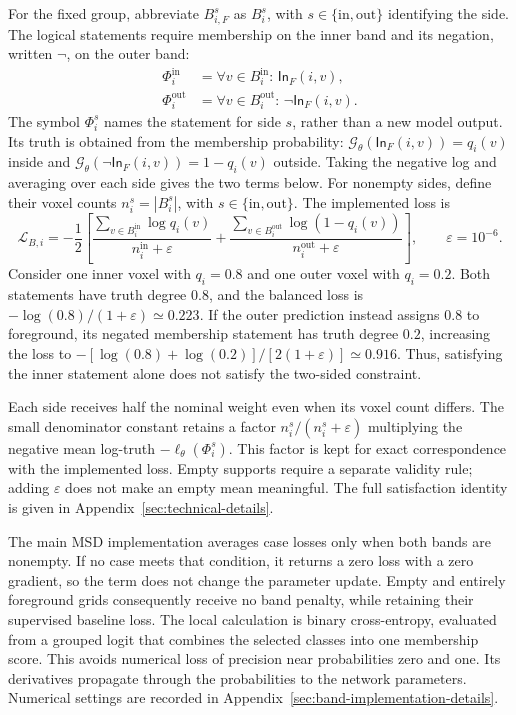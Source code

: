 \documentclass[12pt,a4paper]{article}
\begin{document}
For the fixed group, abbreviate $B_{i,F}^s$ as $B_i^s$, with
$s\in\{\mathrm{in},\mathrm{out}\}$ identifying the side. The logical
statements require membership on the inner band and its negation,
written $\lnot$, on the outer band:
\begin{equation}
\begin{aligned}
\Phi_i^{\mathrm{in}}
 &=\forall v\in B_i^{\mathrm{in}}:\,\mathsf{In}_{F}(i,v),\\
\Phi_i^{\mathrm{out}}
 &=\forall v\in B_i^{\mathrm{out}}:\,\lnot\mathsf{In}_{F}(i,v).
\end{aligned}
\label{eq:band-logical-statements}
\end{equation}
The symbol $\Phi_i^s$ names the statement for side $s$, rather than a
new model output. Its truth is obtained from the membership probability:
$\mathcal G_\theta(\mathsf{In}_F(i,v))=q_i(v)$ inside and
$\mathcal G_\theta(\lnot\mathsf{In}_F(i,v))=1-q_i(v)$ outside.
Taking the negative log and averaging over each side gives the two terms
below. For nonempty sides, define their voxel counts
$n_i^s=|B_i^s|$, with $s\in\{\mathrm{in},\mathrm{out}\}$. The implemented loss is
\begin{equation}
\mathcal L_{B,i}=-\frac12\left[
\frac{\sum_{v\in B_i^{\mathrm{in}}}\log q_i(v)}{n_i^{\mathrm{in}}+\varepsilon}
+\frac{\sum_{v\in B_i^{\mathrm{out}}}\log(1-q_i(v))}{n_i^{\mathrm{out}}+\varepsilon}
\right],\qquad \varepsilon=10^{-6}.
\label{eq:balanced-band-loss}
\end{equation}
Consider one inner voxel with $q_i=0.8$ and one outer voxel with
$q_i=0.2$. Both statements have truth degree $0.8$, and the balanced
loss is $-\log(0.8)/(1+\varepsilon)\simeq0.223$. If the outer
prediction instead assigns $0.8$ to foreground, its negated membership
statement has truth degree $0.2$, increasing the loss to
$-[\log(0.8)+\log(0.2)]/[2(1+\varepsilon)]\simeq0.916$.
Thus, satisfying the inner statement alone does not satisfy the
two-sided constraint.

Each side receives half the nominal weight even when its voxel count
differs. The small denominator constant retains a factor
$n_i^s/(n_i^s+\varepsilon)$ multiplying the negative mean log-truth
$-\ell_\theta(\Phi_i^s)$. This factor is kept for exact correspondence
with the implemented loss. Empty supports require a separate validity
rule; adding $\varepsilon$ does not make an empty mean meaningful.
The full satisfaction identity is given in
Appendix~\ref{sec:technical-details}.

The main MSD implementation averages case losses only when both bands are
nonempty. If no case meets that condition, it returns a zero loss with a
zero gradient, so the term does not change the parameter update. Empty and
entirely foreground grids consequently receive no band penalty, while
retaining their supervised baseline loss. The local calculation is binary
cross-entropy, evaluated from a grouped logit that combines the selected
classes into one membership score. This avoids numerical loss of precision
near probabilities zero and one. Its derivatives propagate through the
probabilities to the network parameters. Numerical settings are recorded in
Appendix~\ref{sec:band-implementation-details}.
\end{document}
